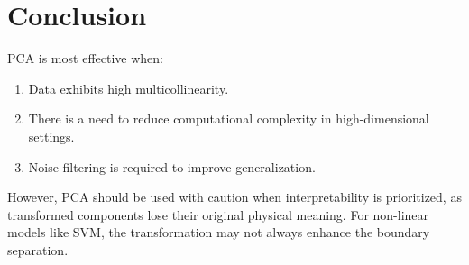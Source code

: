 \documentclass[a4paper,12pt]{article}
\begin{document}
\section{Conclusion}
PCA is most effective when:
\begin{enumerate}
    \item Data exhibits high multicollinearity.
    \item There is a need to reduce computational complexity in high-dimensional settings.
    \item Noise filtering is required to improve generalization.
\end{enumerate}
However, PCA should be used with caution when interpretability is prioritized, as transformed components lose their original physical meaning. For non-linear models like SVM, the transformation may not always enhance the boundary separation.
\end{document}
